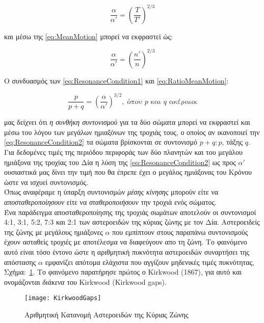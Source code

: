 \begin{equation}\label{eq:Ratio}
 \frac{\alpha}{\alpha'}=(\frac{T}{T'})^{2/3}   
\end{equation} 

και μέσω της \eqref{eq:MeanMotion} μπορεί να εκφραστεί ώς: 

\begin{equation}\label{eq:RatioMeanMotion}
 \frac{\alpha}{\alpha'}=(\frac{n'}{n})^{2/3}   
\end{equation}

Ο συνδυασμός των \eqref{eq:ResonanceCondition1} και \eqref{eq:RatioMeanMotion}:

\begin{equation}\label{eq:ResonanceCondition2}
\frac{p}{p+q}=(\frac{\alpha}{\alpha'})^{3/2}, \; \text{όπου $p$ και $q$ ακέραιοι}   
\end{equation}

μας δείχνει ότι {\it η συνθήκη συντονισμού} για τα δύο σώματα μπορεί να εκφραστεί και μέσω του λόγου των μεγάλων ημιαξόνων της τροχιάς τους, ο οποίος αν ικανοποιεί την \eqref{eq:ResonanceCondition2} τα σώματα βρίσκονται σε συντονισμό $p+q:p$, τάξης $q$.\\
Για δεδομένες τιμές της περιόδου περιφοράς των δύο πλανητών και του μεγάλου ημιάξονα της τροχίας του Δία η λύση της \eqref{eq:ResonanceCondition2} ως προς $\alpha'$ ουσιαστικά μας δίνει την τιμή που θα έπρεπε έχει ο μεγάλος ημιάξονας του Κρόνου ώστε να ισχυεί συντονισμός.\\

Όπως αναφέραμε η ύπαρξη συντονισμών {\it μέσης κίνησης} μπορούν είτε να {\it αποσταθεροποίησουν} είτε να {\it σταθεροποιήσουν} την τροχιά ενός σώματος.\\

Ένα παράδειγμα αποσταθεροποίησης της τροχιάς σωμάτων αποτελούν οι συντονισμοί 4:1, 3:1, 5:2, 7:3 και 2:1 των αστεροειδών της κύριας ζώνης με τον Δία. Αστεροειδείς της ζώνης με μεγάλους ημιάξονες $\alpha$ που εμπίπτουν στους παραπάνω συντονισμούς έχουν ασταθείς τροχιές με αποτέλεσμα να διαφεύγουν απο τη ζώνη. Το φαινόμενο αυτό είναι τόσο έντονο ώστε η αριθμητική πυκνότητα αστεροειδών συναρτήσει της απόστασης $\alpha$ εμφανίζει απότομα ελάχιστα που αγγίζουν μηδενικές τιμές πυκνότητας, Σχήμα:~\ref{fig:KirkwoodGaps}. Το φαινόμενο παρατήρησε πρώτος ο {\en Kirkwood (1867)}, για αυτό και ονομάζονται {\it διάκενα} του {\en Kirkwood (Kirkwood gaps)}.

\begin{figure}[h!]
  \centering
  \texttt{[image: KirkwoodGaps]}
  \gr
  \caption{Αριθμητική Κατανομή Αστεροειδών της Κύριας Ζώνης}\label{fig:KirkwoodGaps}
\end{figure}

